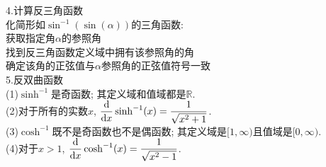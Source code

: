 4.计算反三角函数\\
化简形如$\sin^{-1}(\sin(\alpha))$的三角函数:\\
\phantom{(1)}获取指定角$\alpha$的参照角\\
\phantom{(1)}找到反三角函数定义域中拥有该参照角的角\\
\phantom{(1)}确定该角的正弦值与$\alpha$参照角的正弦值符号一致\\[2ex]

5.反双曲函数\\
(1)$\sinh^{-1}$是奇函数; 其定义域和值域都是$\mathbb{R}$.\\[1ex]
(2)对于所有的实数$x$, $\displaystyle\frac{\mathop{}\!\mathrm{d} }{\mathop{}\!\mathrm{d} x}\sinh^{-1}(x)=\frac{1}{\sqrt{x^2+1}}$.\\[1ex]
(3)$\cosh^{-1}$既不是奇函数也不是偶函数; 其定义域是$[1,\infty)$且值域是$[0,\infty)$.\\[1ex]
(4)对于$x>1$, $\displaystyle\frac{\mathop{}\!\mathrm{d} }{\mathop{}\!\mathrm{d} x}\cosh^{-1}(x)=\frac{1}{\sqrt{x^2-1}}$.\\[1ex]
